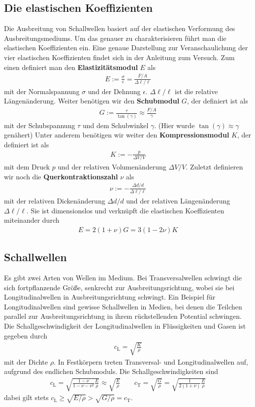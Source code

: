 \documentclass[a4paper, 12pt]{scrartcl}
\begin{document}
\subsection{Die elastischen Koeffizienten}
Die Ausbreitung von Schallwellen basiert auf der elastischen Verformung des Ausbreitungsmediums. Um das genauer zu charakterisieren führt man die elastischen Koeffizienten ein. Eine genaue Darstellung zur Veranschaulichung der vier elastischen Koeffizienten findet sich in der Anleitung zum Versuch. Zum einen definiert man den \textbf{Elastizitätsmodul} $E$ als 
\begin{align}
E:= \frac{\sigma}{\epsilon} = \frac{F / A}{\Delta \ell / \ell}
\end{align}
mit der Normalspannung $\sigma$ und der Dehnung $\epsilon$. $\Delta \ell / \ell$ ist die relative Längenänderung. Weiter benötigen wir den \textbf{Schubmodul} $G$, der definiert ist als 
\begin{align}
G:= \frac{\tau}{\tan(\gamma)} \approx \frac{F / A}{\gamma}
\end{align}
mit der Schubspannung $\tau$ und dem Schubwinkel $\gamma$. (Hier wurde $\tan(\gamma)\approx \gamma$ genähert) Unter anderem benötigen wir weiter den \textbf{Kompressionsmodul} $K$, der definiert ist als 
\begin{align}
K:= - \frac{p}{\Delta V / V} 
\end{align}
mit dem Druck $p$ und der relativen Volumenänderung $\Delta V / V$. Zuletzt definieren wir noch die \textbf{Querkontraktionszahl} $\nu$ als 
\begin{align}
\nu := -\frac{\Delta d / d }{\Delta \ell / \ell}  
\end{align}
mit der relativen Dickenänderung $\Delta d / d$ und der relativen Längenänderung $\Delta \ell / \ell$. Sie ist dimensionslos und verknüpft die elastischen Koeffizienten miteinander durch 
\begin{align*}
E = 2(1+\nu)G = 3 (1-2\nu)K
\end{align*}
\subsection{Schallwellen}
Es gibt zwei Arten von Wellen im Medium. Bei Transversalwellen schwingt die sich fortpflanzende Größe, senkrecht zur Ausbreitungsrichtung, wobei sie bei Longitudinalwellen in Ausbreitungsrichtung schwingt. Ein Beispiel für Longitudinalwellen sind gewisse Schallwellen in Medien, bei denen die Teilchen parallel zur Ausbreitungsrichtung in ihrem rückstellenden Potential schwingen. Die Schallgeschwindigkeit der Longitudinalwellen in Flüssigkeiten und Gasen ist gegeben durch
\begin{align}
c_\textrm{L} = \sqrt{\frac{K}{\rho}} 
\end{align}
mit der Dichte $\rho$. In Festkörpern treten Transversal- und Longitudinalwellen auf, aufgrund des endlichen Schubmoduls. Die Schallgeschwindigkeiten sind 
\begin{align}
c_\textrm{L} = \sqrt{\frac{1-\nu}{1-\nu-\nu^2}  \frac{E}{\rho}} \approx \sqrt{\frac{E}{\rho}} \qquad c_\textrm{T} = \sqrt{\frac{G}{\rho}} = \sqrt{\frac{1}{2(1+\nu)} \frac{E}{\rho}}
\end{align}
dabei gilt stets $c_\textrm{L} \geq \sqrt{E/\rho} > \sqrt{G/\rho} = c_\textrm{T}$. 
\end{document}
